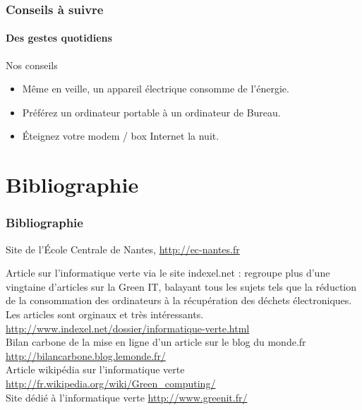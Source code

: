 \documentclass[slidetop,11pt]{beamer}
\begin{document}
\begin{frame} 
  \frametitle{Conseils à suivre}
  \framesubtitle{Des gestes quotidiens}
  \begin{block}{Nos conseils}
     \begin{itemize}[<+->]
       \item Même en veille, un appareil électrique consomme de l'énergie.
       \item Préférez un ordinateur portable à un ordinateur de Bureau.
       \item Éteignez votre modem / box Internet la nuit.
     \end{itemize}
  \end{block}   
\end{frame}



\section{Bibliographie}

\begin{frame} 
\frametitle{Bibliographie}
\begin{thebibliography}{GreenIT}
 {Site de l'\'Ecole Centrale de Nantes, \url{http://ec-nantes.fr}\\}

 Article sur l'informatique verte via le site indexel.net : regroupe plus d'une vingtaine d'articles sur la Green IT, balayant tous les sujets tels que la réduction de la consommation des ordinateurs à la récupération des déchets électroniques. Les articles sont orginaux et très intéressants. \url{http://www.indexel.net/dossier/informatique-verte.html}\\

Bilan carbone de la mise en ligne d'un article sur le blog du monde.fr  \url{http://bilancarbone.blog.lemonde.fr/}\\

 Article wikipédia sur l'informatique verte \url{http://fr.wikipedia.org/wiki/Green_computing/}\\

 Site dédié à l'informatique verte \url{http://www.greenit.fr/}\\

\end{thebibliography}
\end{frame}
\end{document}
